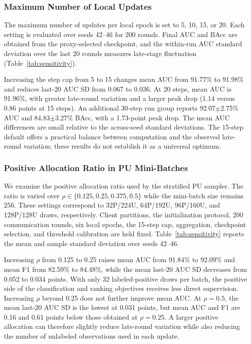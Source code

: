 \documentclass[lettersize,journal]{IEEEtran}
\begin{document}
\subsubsection{Maximum Number of Local Updates}
The maximum number of updates per local epoch is set to 5, 10, 15, or 20. Each setting is evaluated over seeds 42--46 for 200 rounds. Final AUC and BAcc are obtained from the proxy-selected checkpoint, and the within-run AUC standard deviation over the last 20 rounds measures late-stage fluctuation (Table~\ref{tab:sensitivity}).

Increasing the step cap from 5 to 15 changes mean AUC from 91.77\% to 91.98\% and reduces last-20 AUC SD from 0.067 to 0.036. At 20 steps, mean AUC is 91.96\%, with greater late-round variation and a larger peak drop (1.14 versus 0.86 points at 15 steps). An additional 30-step run group reports 92.07$\pm$2.75\% AUC and 84.83$\pm$3.27\% BAcc, with a 1.73-point peak drop. The mean AUC differences are small relative to the across-seed standard deviations. The 15-step default offers a practical balance between computation and the observed late-round variation; these results do not establish it as a universal optimum.

\subsubsection{Positive Allocation Ratio in PU Mini-Batches}
\label{sec:rho_sensitivity}

We examine the positive allocation ratio used by the stratified PU sampler. The ratio is varied over $\rho\in\{0.125,0.25,0.375,0.5\}$ while the mini-batch size remains 256. These settings correspond to 32P/224U, 64P/192U, 96P/160U, and 128P/128U draws, respectively. Client partitions, the initialization protocol, 200 communication rounds, six local epochs, the 15-step cap, aggregation, checkpoint selection, and threshold calibration are held fixed. Table~\ref{tab:sensitivity} reports the mean and sample standard deviation over seeds 42--46.

Increasing $\rho$ from 0.125 to 0.25 raises mean AUC from 91.84\% to 92.09\% and mean F1 from 82.59\% to 84.48\%, while the mean last-20 AUC SD decreases from 0.052 to 0.034 points. With only 32 labeled-positive draws per batch, the positive side of the classification and ranking objectives receives less direct supervision. Increasing $\rho$ beyond 0.25 does not further improve mean AUC. At $\rho=0.5$, the mean last-20 AUC SD is the lowest at 0.031 points, but mean AUC and F1 are 0.16 and 0.61 points below those obtained at $\rho=0.25$. A larger positive allocation can therefore slightly reduce late-round variation while also reducing the number of unlabeled observations used in each update.
\end{document}

